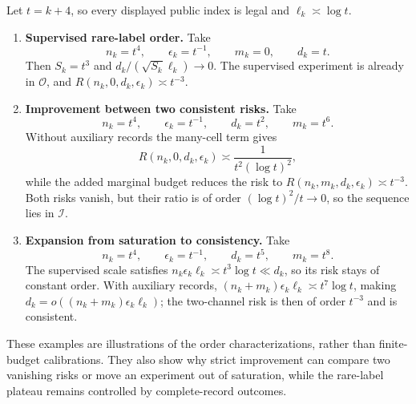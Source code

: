 Let \(t=k+4\), so every displayed public index is legal and \(\ell_k\asymp\log t\).
\begin{enumerate}
\item \textbf{Supervised rare-label order.} Take
\[
n_k=t^4,\qquad \epsilon_k=t^{-1},\qquad m_k=0,\qquad d_k=t.
\]
Then \(S_k=t^3\) and \(d_k/(\sqrt{S_k}\ell_k)\to0\). The supervised experiment is already in \(\mathcal O\), and \(R(n_k,0,d_k,\epsilon_k)\asymp t^{-3}\).

\item \textbf{Improvement between two consistent risks.} Take
\[
n_k=t^4,\qquad \epsilon_k=t^{-1},\qquad d_k=t^2,\qquad m_k=t^6.
\]
Without auxiliary records the many-cell term gives
\[
R(n_k,0,d_k,\epsilon_k)\asymp \frac{1}{t^2(\log t)^2},
\]
while the added marginal budget reduces the risk to \(R(n_k,m_k,d_k,\epsilon_k)\asymp t^{-3}\). Both risks vanish, but their ratio is of order \((\log t)^2/t\to0\), so the sequence lies in \(\mathcal I\).

\item \textbf{Expansion from saturation to consistency.} Take
\[
n_k=t^4,\qquad \epsilon_k=t^{-1},\qquad d_k=t^5,\qquad m_k=t^8.
\]
The supervised scale satisfies \(n_k\epsilon_k\ell_k\asymp t^3\log t\ll d_k\), so its risk stays of constant order. With auxiliary records,
\((n_k+m_k)\epsilon_k\ell_k\asymp t^7\log t\), making
\(d_k=o((n_k+m_k)\epsilon_k\ell_k)\); the two-channel risk is then of order \(t^{-3}\) and is consistent.
\end{enumerate}

These examples are illustrations of the order characterizations, rather than finite-budget calibrations. They also show why strict improvement can compare two vanishing risks or move an experiment out of saturation, while the rare-label plateau remains controlled by complete-record outcomes.
